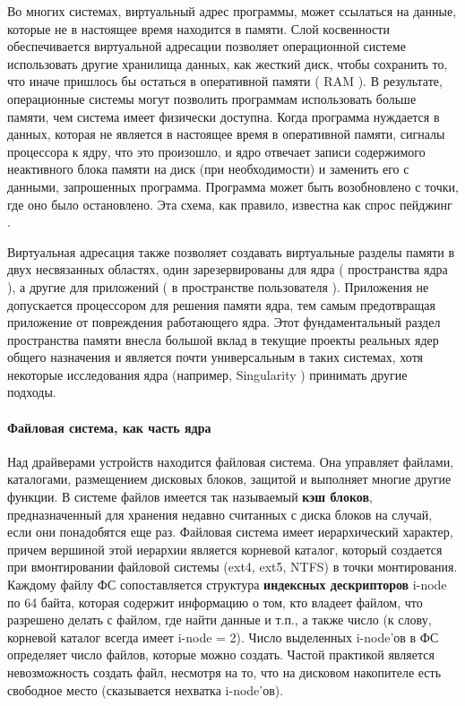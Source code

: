 \documentclass[10pt]{article}
\begin{document}
	Во многих системах, виртуальный адрес программы, может ссылаться на данные, которые не в настоящее время находится в памяти. Слой косвенности обеспечивается виртуальной адресации позволяет операционной системе использовать другие хранилища данных, как жесткий диск, чтобы сохранить то, что иначе пришлось бы остаться в оперативной памяти ( RAM ). В результате, операционные системы могут позволить программам использовать больше памяти, чем система имеет физически доступна. Когда программа нуждается в данных, которая не является в настоящее время в оперативной памяти, сигналы процессора к ядру, что это произошло, и ядро отвечает записи содержимого неактивного блока памяти на диск (при необходимости) и заменить его с данными, запрошенных программа. Программа может быть возобновлено с точки, где оно было остановлено. Эта схема, как правило, известна как спрос пейджинг .

	Виртуальная адресация также позволяет создавать виртуальные разделы памяти в двух несвязанных областях, один зарезервированы для ядра ( пространства ядра ), а другие для приложений ( в пространстве пользователя ). Приложения не допускается процессором для решения памяти ядра, тем самым предотвращая приложение от повреждения работающего ядра. Этот фундаментальный раздел пространства памяти внесла большой вклад в текущие проекты реальных ядер общего назначения и является почти универсальным в таких системах, хотя некоторые исследования ядра (например, Singularity ) принимать другие подходы.
	\paragraph{Файловая система, как часть ядра}
	Над драйверами устройств находится файловая система. Она управляет файлами, каталогами, размещением дисковых блоков, защитой и выполняет многие другие функции. В системе файлов имеется так называемый \textbf{кэш блоков}, предназначенный для хранения недавно считанных с диска блоков на случай, если они понадобятся еще раз. Файловая система имеет иерархический характер, причем вершиной этой иерархии является корневой каталог, который создается при вмонтировании файловой системы (ext4, ext5, NTFS) в точки монтирования. Каждому файлу ФС сопоставляется структура \textbf{индексных дескрипторов} i-node по 64 байта, которая содержит информацию о том, кто владеет файлом, что разрешено делать с файлом, где найти данные и т.п., а также число (к слову, корневой каталог всегда имеет i-node = 2). Число выделенных i-node'ов в ФС определяет число файлов, которые можно создать. Частой практикой является невозможность создать файл, несмотря на то, что на дисковом накопителе есть свободное место (сказывается нехватка i-node'ов).
\end{document}
